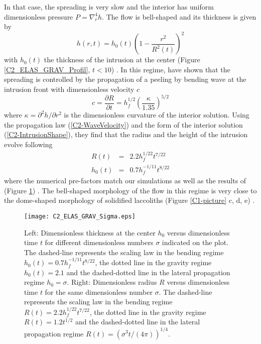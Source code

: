 In that case, the spreading is  very slow and the interior has uniform
dimensionless pressure $P =\nabla_r^4h$.   The flow is bell-shaped and
its thickness is given by
\begin{equation}
  h(r,t) = h_0(t)\left(1-\frac{r^2}{R^2(t)}\right)^2
  \label{C2-IntrusionShape}
\end{equation}
with $h_0(t)$  the thickness  of the intrusion  at the  center (Figure
\ref{C2_ELAS_GRAV_Profil},                                     $t<10$)
\citep{Michaut:2011kg,Lister:2013ia}.       In       this      regime,
\citet{Lister:2013ia} have  shown that the spreading  is controlled by
the propagation  of a peeling by  bending wave at the  intrusion front
with dimensionless velocity $c$
\begin{equation}
  c=    \frac{\partial             R}{\partial            t}             =h_f^{1/2}
  \left(\frac{\kappa}{1.35}\right)^{5/2}
  \label{C2-WaveVelocity}
\end{equation}
where  $\kappa  =  \partial^2  h/\partial r^2$  is  the  dimensionless
curvature  of  the  interior  solution.   Using  the  propagation  law
(\ref{C2-WaveVelocity})  and   the  form  of  the   interior  solution
(\ref{C2-IntrusionShape}), they find that the radius and the height of
the intrusion evolve following
\begin{eqnarray}
  R(t) &=& 2.2h_f^{1/22}t^{7/22}\label{C2-ScalingR}\\
  h_0(t)&=&0.7 h_f^{-1/11}t^{8/22}\label{C2-ScalingH}
\end{eqnarray}
where the numerical  pre-factors match our simulations as  well as the
results  of  \citet{Lister:2013ia}  (Figure  \ref{C2_ELAS_GRAV_Sigma})
. The bell-shaped morphology of the  flow in this regime is very close
to  the  dome-shaped  morphology   of  solidified  laccoliths  (Figure
\ref{C1-picture} c, d, e) \citep{Michaut:2011kg}.

\begin{figure}[h!]
  \begin{center}
    \graphicspath{ {/Users/thorey/Documents/These/Manuscript/Figure/Chapter2/} }
    \texttt{[image: C2\_ELAS\_GRAV\_Sigma.eps]}
    \caption{Left: Dimensionless thickness at  the center $h_0$ versus
      dimensionless  time  $t$  for  different  dimensionless  numbers
      $\sigma$ indicated on the  plot.  The dashed-line represents the
      scaling       law       in        the       bending       regime
      $h_0(t)=0.7 h_f^{-1/11}t^{8/22}$, the dotted line in the gravity
      regime $h_0(t) = 2.1$ and  the dashed-dotted line in the lateral
      propagation  regime $h_0=\sigma$.   Right: Dimensionless  radius
      $R$  versus dimensionless  time $t$  for the  same dimensionless
      number $\sigma$.  The dashed-line  represents the scaling law in
      the bending  regime $R(t)  = 2.2h_f^{1/22}t^{7/22}$,  the dotted
      line  in  the  gravity  regime   $R(t)  =  1.2t^{1/2}$  and  the
      dashed-dotted   line   in   the   lateral   propagation   regime
      $R(t)=\left(\sigma^3 t/(4\pi)\right)^{1/4}$.}
    \label{C2_ELAS_GRAV_Sigma}
  \end{center}
\end{figure}

